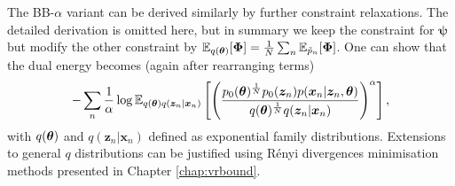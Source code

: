 The BB-$\alpha$ variant can be derived similarly by further constraint relaxations. The detailed derivation is omitted here, but in summary we keep the constraint for $\bm{\psi}$ but modify the other constraint by $\mathbb{E}_{q(\bm{\theta})}[\bm{\Phi}] = \frac{1}{N} \sum_n \mathbb{E}_{\tilde{p}_n}[\bm{\Phi}]$. One can show that the dual energy becomes (again after rearranging terms)
\begin{equation}
- \sum_n \frac{1}{\alpha} \log \mathbb{E}_{ q(\bm{\theta}) q(\bm{z}_n|\bm{x}_n) } \left[ \left( \frac{p_0(\bm{\theta})^{\frac{1}{N}} p_0(\bm{z}_n) p( \bm{x}_n | \bm{z}_n, \bm{\theta})}{ q(\bm{\theta})^{\frac{1}{N}} q(\bm{z}_n|\bm{x}_n) } \right)^{\alpha} \right],
\label{eq:bbalpha_energy_lvm}
\end{equation}
with $q(\bm{\theta})$ and $q(\bm{z}_n|\bm{x}_n)$ defined as exponential family distributions. Extensions to general $q$ distributions can be justified using R{\'e}nyi divergences minimisation methods presented in Chapter \ref{chap:vrbound}.

